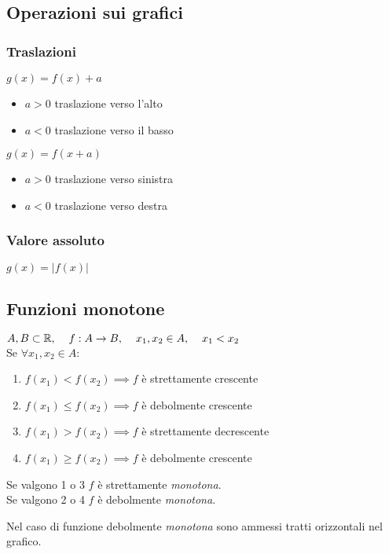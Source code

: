 \documentclass{article}
\begin{document}
\subsection{Operazioni sui grafici}
\subsubsection{Traslazioni}
\(g(x) = f(x) + a\)
\begin{itemize}
    \item \(a > 0\) traslazione verso l'alto
    \item \(a < 0\) traslazione verso il basso
\end{itemize}

\noindent\(g(x) = f(x + a)\)
\begin{itemize}
    \item \(a > 0\) traslazione verso sinistra
    \item \(a < 0\) traslazione verso destra
\end{itemize}

\subsubsection{Valore assoluto}
\(g(x) = \lvert f(x) \rvert\)

\subsection{Funzioni monotone}
\begin{dfn}
\(A, B \subset \mathbb{R}, \hspace{.4cm} f: A \rightarrow B, \hspace{.4cm} x_1, x_2 \in A, \hspace{.4cm} x_1 < x_2\)\\
Se \(\forall x_1,x_2 \in A\):
\begin{enumerate}
    \item \(f(x_1) < f(x_2) \implies f\) è strettamente crescente
    \item \(f(x_1) \leq f(x_2) \implies f\) è debolmente crescente
    \item \(f(x_1) > f(x_2) \implies f\) è strettamente decrescente
    \item \(f(x_1) \geq f(x_2) \implies f\) è debolmente crescente
\end{enumerate}
Se valgono 1 o 3 \(f\) è strettamente \emph{monotona}. \\
Se valgono 2 o 4 \(f\) è debolmente \emph{monotona}.
\end{dfn}

Nel caso di funzione debolmente \emph{monotona} sono ammessi tratti orizzontali nel grafico.
\end{document}
